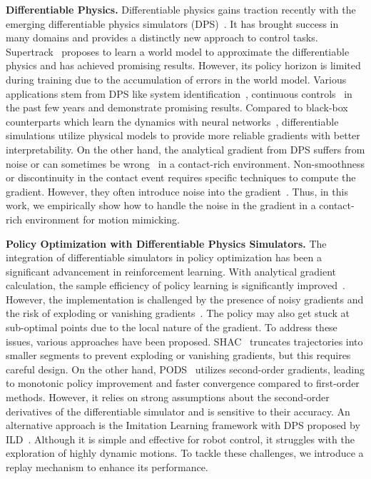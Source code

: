 \textbf{Differentiable Physics.}
Differentiable physics gains traction recently with the emerging differentiable physics simulators (DPS)~\citep{hu2019chainqueen, hu2019difftaichi, huang2021plasticinelab, qiao2021differentiable}. It has brought success in many domains and provides a distinctly new approach to control tasks. Supertrack~\citep{fussell2021supertrack} proposes to learn a world model to approximate the differentiable physics and has achieved promising results. However, its policy horizon is limited during training due to the accumulation of errors in the world model.
Various applications stem from DPS like system identification~\citep{gradsim}, continuous controls~\citep{lin2022diffskill, xu2022accelerated} in the past few years and demonstrate promising results. Compared to black-box counterparts which learn the dynamics with neural networks~\citep{fussell2021supertrack, li2020visual}, differentiable simulations utilize physical models to provide more reliable gradients with better interpretability. On the other hand, the analytical gradient from DPS suffers from noise or can sometimes be wrong~\citep{zhong2022differentiable, suh2022does} in a contact-rich environment. Non-smoothness or discontinuity in the contact event requires specific techniques to compute the gradient. However, they often introduce noise into the gradient~\citep{zhong2022differentiable}. Thus, in this work, we empirically show how to handle the noise in the gradient in a contact-rich environment for motion mimicking.  

\textbf{Policy Optimization with Differentiable Physics Simulators.} The integration of differentiable simulators in policy optimization has been a significant advancement in reinforcement learning. With analytical gradient calculation, the sample efficiency of policy learning is significantly improved~\citep{Mozer1989AFB, pmlr-v139-mora21a, xu2022accelerated}. However, the implementation is challenged by the presence of noisy gradients and the risk of exploding or vanishing gradients~\citep{Degrave2017ADP}. The policy may also get stuck at sub-optimal points due to the local nature of the gradient. To address these issues, various approaches have been proposed. SHAC~\citep{xu2022accelerated} truncates trajectories into smaller segments to prevent exploding or vanishing gradients, but this requires careful design. On the other hand, PODS~\citep{pmlr-v139-mora21a} utilizes second-order gradients, leading to monotonic policy improvement and faster convergence compared to first-order methods. However, it relies on strong assumptions about the second-order derivatives of the differentiable simulator and is sensitive to their accuracy. An alternative approach is the Imitation Learning framework with DPS proposed by ILD~\citep{chen2022imitation}. Although it is simple and effective for robot control, it struggles with the exploration of highly dynamic motions. To tackle these challenges, we introduce a replay mechanism to enhance its performance.



